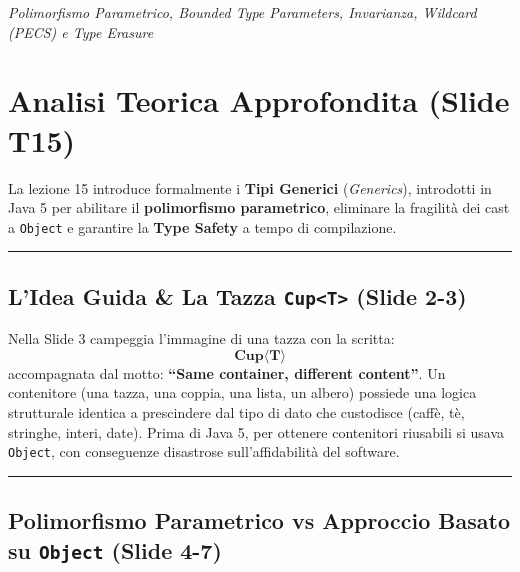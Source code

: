\documentclass[11pt,a4paper,oneside]{report}
\newcommand{\passthrough}[1]{#1}
\begin{document}
{\small\sffamily\color{accentblue!80!black}\textit{Polimorfismo Parametrico, Bounded Type Parameters, Invarianza, Wildcard (PECS) e Type Erasure}}

\vspace{0.8em}

\section{Analisi Teorica Approfondita (Slide
T15)}\label{chap14_analisi-teorica-approfondita-slide-t15}

La lezione 15 introduce formalmente i \textbf{Tipi Generici}
(\emph{Generics}), introdotti in Java 5 per abilitare il
\textbf{polimorfismo parametrico}, eliminare la fragilità dei cast a
\passthrough{\lstinline!Object!} e garantire la \textbf{Type Safety} a
tempo di compilazione.

\begin{center}\rule{0.5\linewidth}{0.5pt}\end{center}

\subsection{\texorpdfstring{L'Idea Guida \& La Tazza
\texttt{Cup\textless{}T\textgreater{}} (Slide
2-3)}{L'Idea Guida \& La Tazza Cup\textless T\textgreater{} (Slide 2-3)}}\label{chap14_lidea-guida-la-tazza-cupt-slide-2-3}

Nella Slide 3 campeggia l'immagine di una tazza con la scritta:
\[\mathbf{Cup\langle T\rangle}\] accompagnata dal motto: \textbf{``Same
container, different content''}. Un contenitore (una tazza, una coppia,
una lista, un albero) possiede una logica strutturale identica a
prescindere dal tipo di dato che custodisce (caffè, tè, stringhe,
interi, date). Prima di Java 5, per ottenere contenitori riusabili si
usava \passthrough{\lstinline!Object!}, con conseguenze disastrose
sull'affidabilità del software.

\begin{center}\rule{0.5\linewidth}{0.5pt}\end{center}

\subsection{\texorpdfstring{Polimorfismo Parametrico vs Approccio Basato
su \texttt{Object} (Slide
4-7)}{Polimorfismo Parametrico vs Approccio Basato su Object (Slide 4-7)}}\label{chap14_polimorfismo-parametrico-vs-approccio-basato-su-object-slide-4-7}
\end{document}
